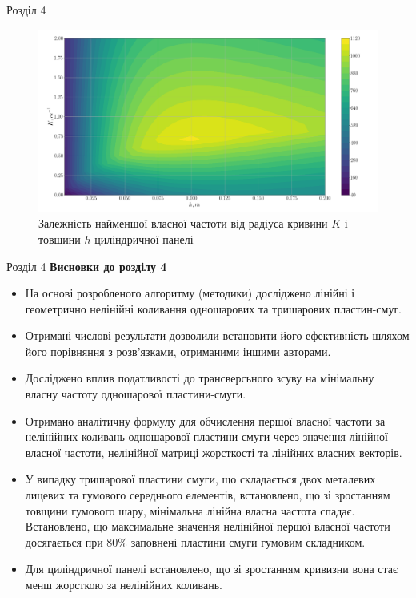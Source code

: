 \documentclass[8pt]{beamer}
\numberwithin{figure}{section}
\numberwithin{equation}{section}
\numberwithin{table}{section}
\begin{document}
\begin{frame}{Розділ 4}

\begin{figure}
	\includegraphics[scale=0.2]{pic/thickness_curvature_contour_plot2.png}
		\caption{Залежність найменшої власної частоти від радіуса кривини $K$ і товщини $h$ циліндричної панелі}
		\label{fig:omage_K_h}
\end{figure}

\end{frame}

\begin{frame}{Розділ 4}
\textbf{Висновки до розділу 4}\\
\vspace{1em}
\begin{itemize}
\item На основі розробленого алгоритму (методики) досліджено лінійні і геометрично нелінійні коливання одношарових та тришарових пластин-смуг.
\item Отримані числові результати дозволили встановити його ефективність шляхом його порівняння з розв'язками, отриманими іншими авторами.
\item Досліджено вплив податливості до трансверсьного зсуву на мінімальну власну частоту одношарової пластини-смуги.
\item Отримано аналітичну формулу для обчислення першої власної частоти за нелінійних коливань одношарової пластини смуги через значення лінійної власної частоти, нелінійної матриці жорсткості та лінійних власних векторів.
\item У випадку тришарової пластини смуги, що складається двох металевих лицевих та гумового середнього елементів, встановлено, що зі зростанням товщини гумового шару, мінімальна лінійна власна частота спадає. Встановлено, що максимальне значення нелінійної  першої власної частоти досягається при 80\% заповнені пластини смуги гумовим складником. 
\item Для циліндричної панелі встановлено, що зі зростанням кривизни вона стає менш жорсткою за нелінійних коливань. 
\end{itemize}

\end{frame}
\end{document}
